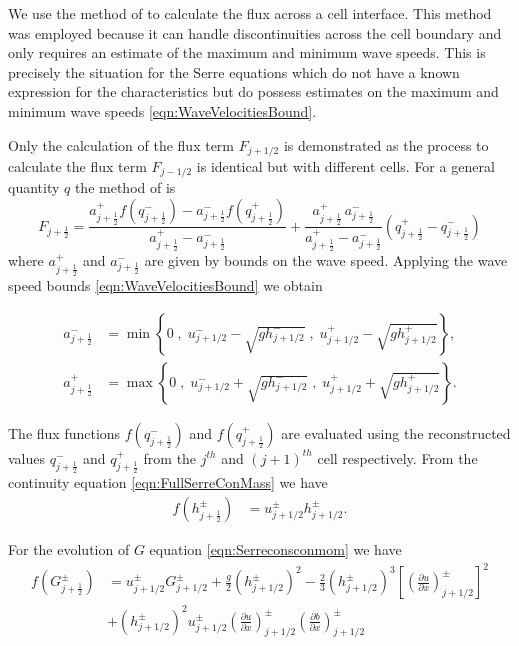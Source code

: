 We use the method of \citet{Kurganov-etal-2001-707} to calculate the flux across a cell interface. This method was employed because it can handle discontinuities across the cell boundary and only requires an estimate of the maximum and minimum wave speeds. This is precisely the situation for the Serre equations which do not have a known expression for the characteristics but do possess estimates on the maximum and minimum wave speeds \eqref{eqn:WaveVelocitiesBound}.

Only the calculation of the flux term $F_{j+1/2}$ is demonstrated as the process to calculate the flux term $F_{j-1/2}$ is identical but with different cells. For a general quantity $q$ the method of \citet{Kurganov-etal-2001-707} is
\begin{equation}\label{eqn:HLL_flux}
F_{j+\frac{1}{2}} = \dfrac{a^+_{j+\frac{1}{2}} f\left(q^-_{j+\frac{1}{2}}\right) - a^-_{j+\frac{1}{2}} f\left(q^+_{j+\frac{1}{2}}\right)}{a^+_{j+\frac{1}{2}} - a^-_{j+\frac{1}{2}}}  + \dfrac{a^+_{j+\frac{1}{2}} \, a^-_{j+\frac{1}{2}}}{a^+_{j+\frac{1}{2}} - a^-_{j+\frac{1}{2}}} \left(  q^+_{j+\frac{1}{2}} - q^-_{j+\frac{1}{2}} \right)
\end{equation}
where $a^+_{j+\frac{1}{2}}$ and $a^-_{j+\frac{1}{2}}$ are given by bounds on the wave speed. Applying the wave speed bounds \eqref{eqn:WaveVelocitiesBound} we obtain

\begin{align}
a^-_{j+\frac{1}{2}} &= \min\left\lbrace 0\;,\;  u^-_{j + 1/2} - \sqrt{g h^-_{j + 1/2}}  \;,\;u^+_{j + 1/2} - \sqrt{g h^+_{j + 1/2}} \right\rbrace  ,\\
a^+_{j+\frac{1}{2}} &= \max\left\lbrace 0 \;,\;  u^-_{j + 1/2} + \sqrt{g h^-_{j + 1/2}}  \;,\;u^+_{j + 1/2} + \sqrt{g h^+_{j + 1/2}} \right\rbrace .
\label{eqn:WaveSpeedBoundsFluxApprox}
\end{align}

The flux functions $f(q^-_{j+\frac{1}{2}})$ and $f(q^+_{j+\frac{1}{2}})$ are evaluated using the reconstructed values $q^-_{j+\frac{1}{2}}$ and $q^+_{j+\frac{1}{2}}$ from the $j^{th}$ and $(j+1)^{th}$ cell respectively. From the continuity equation \eqref{eqn:FullSerreConMass} we have
\begin{align*}
f\left(h^\pm_{j+\frac{1}{2}}\right) &= u^\pm_{j + 1/2}  h^\pm_{j + 1/2}.
\end{align*}

For the evolution of $G$ equation \eqref{eqn:Serreconsconmom} we have 
\begin{align}
f\left(G^\pm_{j+\frac{1}{2}}\right) &=  u^\pm_{j + 1/2} G^\pm_{j + 1/2}  + \frac{g}{2}\left(h^\pm_{j + 1/2} \right)^2 - \frac{2}{3}\left(h^\pm_{j + 1/2}\right)^3 \left[\left(\frac{\partial {u}}{\partial x} \right)^\pm_{j + 1/2} \right]^2 \nonumber\\ &+ \left(h^\pm_{j + 1/2}\right)^2 u^\pm_{j + 1/2} \left(\frac{\partial {u}}{\partial x} \right)^\pm_{j + 1/2} \left(\frac{\partial b}{\partial x} \right)^\pm_{j + 1/2}
\label{eqn:FluxIrrotNum}
\end{align}

